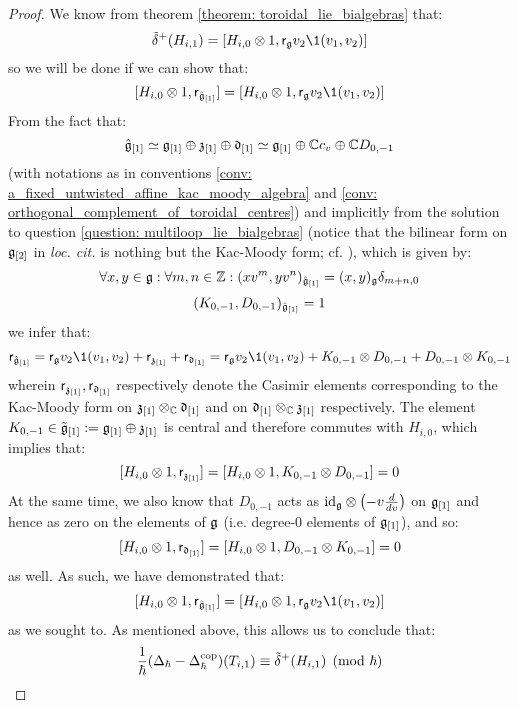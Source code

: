 \begin{proof}
                We know from theorem \ref{theorem: toroidal_lie_bialgebras} that:
                    $$\tilde{\delta}^+(H_{i, 1}) = [ H_{i, 0} \tensor 1, \sfr_{\g} v_2 \1(v_1, v_2) ]$$
                so we will be done if we can show that:
                    $$[H_{i, 0} \tensor 1, \sfr_{ \hat{\g}_{[1]} }] = [ H_{i, 0} \tensor 1, \sfr_{\g} v_2 \1(v_1, v_2) ]$$
                From the fact that:
                    $$\hat{\mathfrak{g}}_{[1]} \simeq \mathfrak{g}_{[1]} \oplus \mathfrak{z}_{[1]} \oplus \mathfrak{d}_{[1]} \simeq \mathfrak{g}_{[1]} \oplus \mathbb{C} c_v \oplus \mathbb{C} D_{0, -1}$$
                (with notations as in conventions \ref{conv: a_fixed_untwisted_affine_kac_moody_algebra} and \ref{conv: orthogonal_complement_of_toroidal_centres}) and implicitly from the solution to question \ref{question: multiloop_lie_bialgebras} (notice that the bilinear form on $\mathfrak{g}_{[2]}$ in \textit{loc. cit.} is nothing but the Kac-Moody form; cf. \cite[Chapter 7]{kac_infinite_dimensional_lie_algebras}), which is given by:
                    $$\forall x, y \in \mathfrak{g}: \forall m, n \in \mathbb{Z}: (x v^m, y v^n)_{\hat{\mathfrak{g}}_{[1]}} = (x, y)_{\mathfrak{g}} \delta_{m + n, 0}$$
                    $$(K_{0, -1}, D_{0, -1})_{\hat{\mathfrak{g}}_{[1]}} = 1$$
                we infer that:
                    $$\sfr_{ \hat{\g}_{[1]} } = \sfr_{\g} v_2 \1(v_1, v_2) + \sfr_{\z_{[1]}} + \sfr_{\d_{[1]}} = \sfr_{\g} v_2 \1(v_1, v_2) + K_{0, -1} \tensor D_{0, -1} + D_{0, -1} \tensor K_{0, -1}$$
                wherein $\mathsf{r}_{\mathfrak{z}_{[1]}}, \mathsf{r}_{\mathfrak{d}_{[1]}}$ respectively denote the Casimir elements corresponding to the Kac-Moody form on $\z_{[1]} \tensor_{\bbC} \d_{[1]}$ and on $\d_{[1]} \tensor_{\bbC} \z_{[1]}$ respectively. The element $K_{0, -1} \in \tilde{\mathfrak{g}}_{[1]} := \mathfrak{g}_{[1]} \oplus \mathfrak{z}_{[1]}$ is central and therefore commutes with $H_{i, 0}$, which implies that:
                    $$[H_{i, 0} \tensor 1, \sfr_{\z_{[1]}}] = [H_{i, 0} \tensor 1, K_{0, -1} \tensor D_{0, -1}] = 0$$
                At the same time, we also know that $D_{0, -1}$ acts as $\id_{\g} \tensor \left(-v \frac{d}{dv}\right)$ on $\mathfrak{g}_{[1]}$ and hence as zero on the elements of $\mathfrak{g}$ (i.e. degree-$0$ elements of $\mathfrak{g}_{[1]}$), and so:
                    $$[H_{i, 0} \tensor 1, \sfr_{\d_{[1]}}] = [H_{i, 0} \tensor 1, D_{0, -1} \tensor K_{0, -1}] = 0$$
                as well. As such, we have demonstrated that:
                    $$[H_{i, 0} \tensor 1, \sfr_{ \hat{\g}_{[1]} }] = [ H_{i, 0} \tensor 1, \sfr_{\g} v_2 \1(v_1, v_2) ]$$
                as we sought to. As mentioned above, this allows us to conclude that:
                    $$\frac{1}{\hbar}( \Delta_{\hbar} - \Delta_{\hbar}^{\mathrm{cop}} )(T_{i, 1}) \equiv \tilde{\delta}^+(H_{i, 1}) \pmod{\hbar}$$
            \end{proof}
